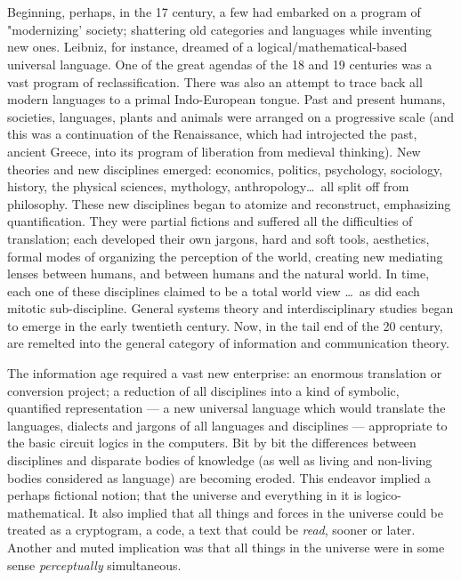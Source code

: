 \chapter{}

Beginning, perhaps, in the 17 century, a few had embarked on a program of "modernizing' society; shattering old categories and languages while inventing new ones. Leibniz, for instance, dreamed of a logical\slash mathematical-based universal language. One of the great agendas of the 18 and 19 centuries was a vast program of reclassification. There was also an attempt to trace back all modern languages to a primal Indo-European tongue. Past and present humans, societies, languages, plants and animals were arranged on a progressive scale (and this was a continuation of the Renaissance, which had introjected the past, ancient Greece, into its program of liberation from medieval thinking). New theories and new disciplines emerged: economics, politics, psychology, sociology, history, the physical sciences, mythology, anthropology\ldots\ all split off from philosophy. These new disciplines began to atomize and reconstruct, emphasizing quantification. They were partial fictions and suffered all the difficulties of translation; each developed their own jargons, hard and soft tools, aesthetics, formal modes of organizing the perception of the world, creating new mediating lenses between humans, and between humans and the natural world. In time, each one of these disciplines claimed to be a total world view \ldots\ as did each mitotic sub-discipline. General systems theory and interdisciplinary studies began to emerge in the early twentieth century. Now, in the tail end of the 20 century, are remelted into the general category of information and communication theory.

The information age required a vast new enterprise: an enormous translation or conversion project; a reduction of all disciplines into a kind of symbolic, quantified representation --- a new universal language which would translate the languages, dialects and jargons of all languages and disciplines --- appropriate to the basic circuit logics in the computers. Bit by bit the differences between disciplines and disparate bodies of knowledge (as well as living and non-living bodies considered as language) are becoming eroded. This endeavor implied a perhaps fictional notion; that the universe and everything in it is logico-mathematical. It also implied that all things and forces in the universe could be treated as a cryptogram, a code, a text that could be \emph{read}, sooner or later. Another and muted implication was that all things in the universe were in some sense \emph{perceptually} simultaneous.

